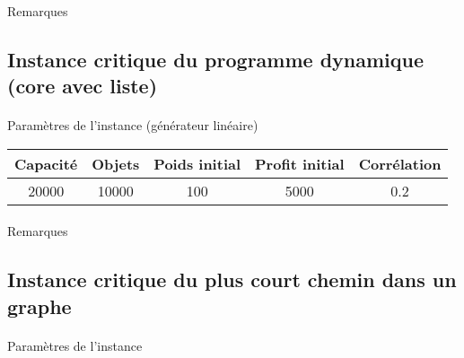 \documentclass[12pt]{article}
\begin{document}
\paragraph{}Remarques

\subsection{Instance critique du programme dynamique (core avec liste)}

\paragraph{}Paramètres de l'instance (générateur linéaire)

\begin{tabular}{|c|c|c|c|c|}
\hline
Capacité & Objets & Poids initial & Profit initial & Corrélation \\
\hline
20000 & 10000 & 100 & 5000 & 0.2 \\
\hline
\end{tabular}

\begin{figure}[!h]
\begin{floatrow}
\end{floatrow}
\end{figure}

\paragraph{}Remarques

\subsection{Instance critique du plus court chemin dans un graphe}

\paragraph{}Paramètres de l'instance
\end{document}
